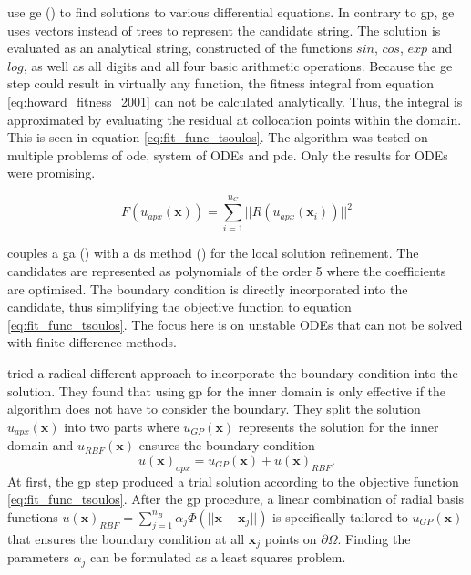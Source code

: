 \documentclass[./\jobname.tex]{subfiles}
\begin{document}
\cite{tsoulos_solving_2006} use \gls{ge} (\cite{ryan_grammatical_1998}) to find solutions to various differential equations. In contrary to \gls{gp}, \gls{ge} uses vectors instead of trees to represent the candidate string. The solution is evaluated as an analytical string, constructed of the functions $sin$, $cos$, $exp$ and $log$, as well as all digits and all four basic arithmetic operations. Because the \gls{ge} step could result in virtually any function, the fitness integral from equation \eqref{eq:howard_fitness_2001} can not be calculated analytically. Thus, the integral is approximated by evaluating the residual at collocation points within the domain. This is seen in equation \eqref{eq:fit_func_tsoulos}. The algorithm was tested on multiple problems of \gls{ode}, system of ODEs and \gls{pde}. Only the results for ODEs were promising.

\begin{equation}
\label{eq:fit_func_tsoulos}
F(u_{apx}(\mathbf{x})) = \sum_{i=1}^{n_C} ||R(u_{apx}(\mathbf{x}_i))||^2
\end{equation} 

\cite{mastorakis_unstable_2006} couples a \gls{ga} (\cite{holland_outline_1962}) with a \gls{ds} method (\cite{nelder_simplex_1965}) for the local solution refinement. The candidates are represented as polynomials of the order 5 where the coefficients are optimised. The boundary condition is directly incorporated into the candidate, thus simplifying the objective function to equation \eqref{eq:fit_func_tsoulos}. The focus here is on unstable ODEs that can not be solved with finite difference methods. 

\cite{sobester_genetic_2008} tried a radical different approach to incorporate the boundary condition into the solution. They found that using \gls{gp} for the inner domain is only effective if the algorithm does not have to consider the boundary. They split the solution $u_{apx}(\mathbf{x})$ into two parts where $u_{GP}(\mathbf{x})$ represents the solution for the inner domain and $u_{RBF}(\mathbf{x})$ ensures the boundary condition 
\begin{equation}
\label{eq:solution_sobester}
u(\mathbf{x})_{apx} = u_{GP}(\mathbf{x}) + u(\mathbf{x})_{RBF}.
\end{equation}
At first, the \gls{gp} step produced a trial solution according to the objective function \eqref{eq:fit_func_tsoulos}. After the \gls{gp} procedure, a linear combination of radial basis functions $u(\mathbf{x})_{RBF} = \sum_{j=1}^{n_B} \alpha_j \Phi (||\mathbf{x}-\mathbf{x}_{j}||)$ is specifically tailored to $u_{GP}(\mathbf{x})$ that ensures the boundary condition at all $\mathbf{x}_{j}$ points on $\partial \Omega$. Finding the parameters $\alpha_j$ can be formulated as a least squares problem. 
\end{document}
